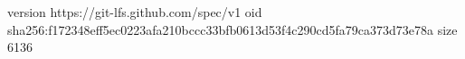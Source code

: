 version https://git-lfs.github.com/spec/v1
oid sha256:f172348eff5ec0223afa210bccc33bfb0613d53f4c290cd5fa79ca373d73e78a
size 6136
